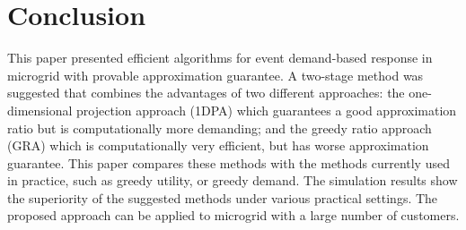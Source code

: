 
 \vspace{-5pt}
\section{Conclusion}\label{sec:concl}

This paper presented efficient algorithms for event demand-based response in microgrid with provable approximation guarantee. 
A two-stage method was suggested that combines the advantages of two different approaches: the one-dimensional projection approach (1DPA) which guarantees a good approximation ratio but is computationally more demanding; and the greedy ratio approach (GRA) which is computationally very efficient, but has  worse approximation guarantee. This paper compares these methods with the methods currently used in practice, such as greedy utility, or greedy demand. The simulation results show the superiority of the suggested methods under various practical settings. The proposed approach can be applied to microgrid with a large number of customers.

